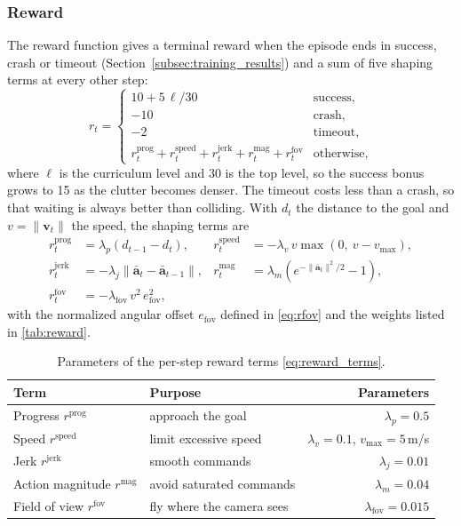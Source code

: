 \subsubsection{Reward}
\label{subsec:reward}
The reward function gives a terminal reward when the episode ends in success, crash or timeout (Section~\ref{subsec:training_results}) and a sum of five shaping terms at every other step:
\begin{equation}
    r_t =
    \begin{cases}
        10 + 5\,\ell/30 & \text{success}, \\
        -10 & \text{crash}, \\
        -2 & \text{timeout}, \\
        r^{\mathrm{prog}}_t + r^{\mathrm{speed}}_t + r^{\mathrm{jerk}}_t + r^{\mathrm{mag}}_t + r^{\mathrm{fov}}_t & \text{otherwise},
    \end{cases}
    \label{eq:reward}
\end{equation}
where $\ell$ is the curriculum level and 30 is the top level, so the success bonus grows to 15 as the clutter becomes denser. The timeout costs less than a crash, so that waiting is always better than colliding. With $d_t$ the distance to the goal and $v = \lVert \mathbf{v}_t \rVert$ the speed, the shaping terms are
\begin{align}
    r^{\mathrm{prog}}_t &= \lambda_p \left(d_{t-1} - d_t\right), &
    r^{\mathrm{speed}}_t &= -\lambda_v\, v \max\left(0,\ v - v_{\mathrm{max}}\right), \nonumber\\
    r^{\mathrm{jerk}}_t &= -\lambda_j \left\lVert \bar{\mathbf{a}}_t - \bar{\mathbf{a}}_{t-1} \right\rVert, &
    r^{\mathrm{mag}}_t &= \lambda_m \left(e^{-\lVert \bar{\mathbf{a}}_t \rVert^2 / 2} - 1\right), \label{eq:reward_terms}\\
    r^{\mathrm{fov}}_t &= -\lambda_{\mathrm{fov}}\, v^2\, e_{\mathrm{fov}}^2, \nonumber
\end{align}
with the normalized angular offset $e_{\mathrm{fov}}$ defined in \eqref{eq:rfov} and the weights listed in \autoref{tab:reward}.

\begin{table}[htbp]
    \centering
    \caption{Parameters of the per-step reward terms \eqref{eq:reward_terms}.}
    \label{tab:reward}
    \begin{tabular}{llr}
        \hline
        Term & Purpose & Parameters \\
        \hline
        Progress $r^{\mathrm{prog}}$ & approach the goal & $\lambda_p = 0.5$ \\
        Speed $r^{\mathrm{speed}}$ & limit excessive speed & $\lambda_v = 0.1$, $v_{\mathrm{max}} = 5$\,m/s \\
        Jerk $r^{\mathrm{jerk}}$ & smooth commands & $\lambda_j = 0.01$ \\
        Action magnitude $r^{\mathrm{mag}}$ & avoid saturated commands & $\lambda_m = 0.04$ \\
        Field of view $r^{\mathrm{fov}}$ & fly where the camera sees & $\lambda_{\mathrm{fov}} = 0.015$ \\
        \hline
    \end{tabular}
\end{table}

